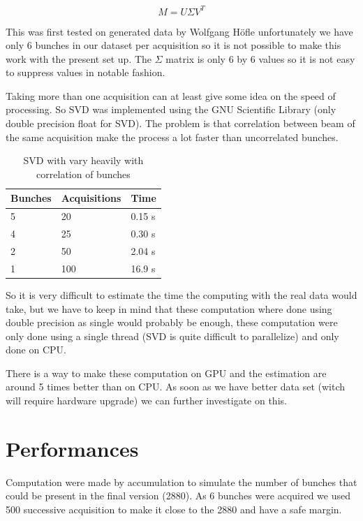 $$M = U \Sigma V^{T}$$ 

This was first tested on generated data by Wolfgang H{\"o}fle\cite{HofleEvian10} unfortunately we have only 6 bunches in our dataset per acquisition so it is not possible to make this work with the present set up. The $\Sigma$ matrix is only 6 by 6 values so it is not easy to suppress values in notable fashion.

Taking more than one acquisition can at least give some idea on the speed of processing. So SVD was implemented using the GNU Scientific Library (only double precision float for SVD). The problem is that correlation between beam of the same acquisition make the process a lot faster than uncorrelated bunches.

\begin{table}[H]
	\caption{SVD with vary heavily with correlation of bunches}
	\label{tab:SVD}
	\centering
	\begin{tabular}{|l|l|l|}
		\hline
			Bunches & Acquisitions & Time \\
		\hline
			5 & 20 & 0.15 s \\
			4 & 25 & 0.30 s \\
			2 & 50 & 2.04 s \\
			1 & 100 & 16.9 s \\
		\hline
	\end{tabular}
\end{table}

So it is very difficult to estimate the time the computing with the real data would take, but we have to keep in mind that these computation where done using double precision as single would probably be enough, these computation were only done using a single thread (SVD is quite difficult to parallelize) and only done on \gls{CPU}.

There is a way to make these computation on \gls{GPU}\cite{Lahabar09} and the estimation are around 5 times better than on \gls{CPU}. As soon as we have better data set (witch will require hardware upgrade) we can further investigate on this.

\section{Performances}
\label{sec:perf}

Computation were made by accumulation to simulate the number of bunches that could be present in the final version (2880). As 6 bunches were acquired we used 500 successive acquisition to make it close to the 2880 and have a safe margin.


